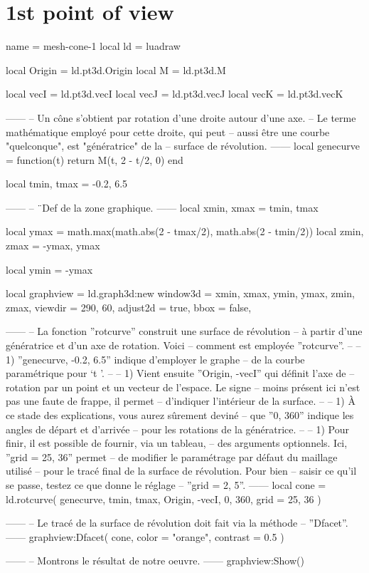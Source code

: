 \documentclass[varwidth, border = 3pt]{standalone}
\begin{document}
\section*{1st point of view}

\begin{luadraw*}{name = mesh-cone-1}
local ld = luadraw

local Origin = ld.pt3d.Origin
local M      = ld.pt3d.M

local vecI = ld.pt3d.vecI
local vecJ = ld.pt3d.vecJ
local vecK = ld.pt3d.vecK

------
-- Un cône s'obtient par rotation d'une droite autour d'une axe.
-- Le terme mathématique employé pour cette droite, qui peut
-- aussi être une courbe "quelconque", est "génératrice" de la
-- surface de révolution.
------
local genecurve = function(t)
  return M(t, 2 - t/2, 0)
end

local tmin, tmax = -0.2, 6.5

------
-- ¨Def de la zone graphique.
------
local xmin, xmax = tmin, tmax

local ymax = math.max(math.abs(2 - tmax/2), math.abs(2 - tmin/2))
local zmin, zmax = -ymax, ymax

local ymin = -ymax

local graphview = ld.graph3d:new{
  window3d = {xmin, xmax, ymin, ymax, zmin, zmax},
  viewdir  = {290, 60},
  adjust2d = true,
  bbox     = false,
}

------
-- La fonction ''rotcurve'' construit une surface de révolution
-- à partir d'une génératrice et d'un axe de rotation. Voici
-- comment est employée ''rotcurve''.
--
--     1) ''genecurve, -0.2, 6.5'' indique d'employer le graphe
--     de la courbe paramétrique pour `t \in [-0.2 .. 6.5]'.
--
--     1) Vient ensuite ''{Origin, -vecI}'' qui définit l'axe de
--     rotation par un point et un vecteur de l'espace. Le signe
--     moins présent ici n'est pas une faute de frappe, il permet
--     d'indiquer l'intérieur de la surface.
--
--     1) À ce stade des explications, vous aurez sûrement deviné
--     que ''0, 360'' indique les angles de départ et d'arrivée
--     pour les rotations de la génératrice.
--
--     1) Pour finir, il est possible de fournir, via un tableau,
--     des arguments optionnels. Ici, ''grid = {25, 36}'' permet
--     de modifier le paramétrage par défaut du maillage utilisé
--     pour le tracé final de la surface de révolution. Pour bien
--     saisir ce qu'il se passe, testez ce que donne le réglage
--     ''grid = {2, 5}''.
------
local cone = ld.rotcurve(
  genecurve, tmin, tmax,
  {Origin, -vecI},
  0, 360,
  {
    grid = {25, 36}
  }
)

------
-- Le tracé de la surface de révolution doit fait via la méthode
-- ''Dfacet''.
------
graphview:Dfacet(
  cone,
  {
    color  = "orange",
    contrast = 0.5
  }
)

------
-- Montrons le résultat de notre oeuvre.
------
graphview:Show()
\end{luadraw*}
\end{document}

